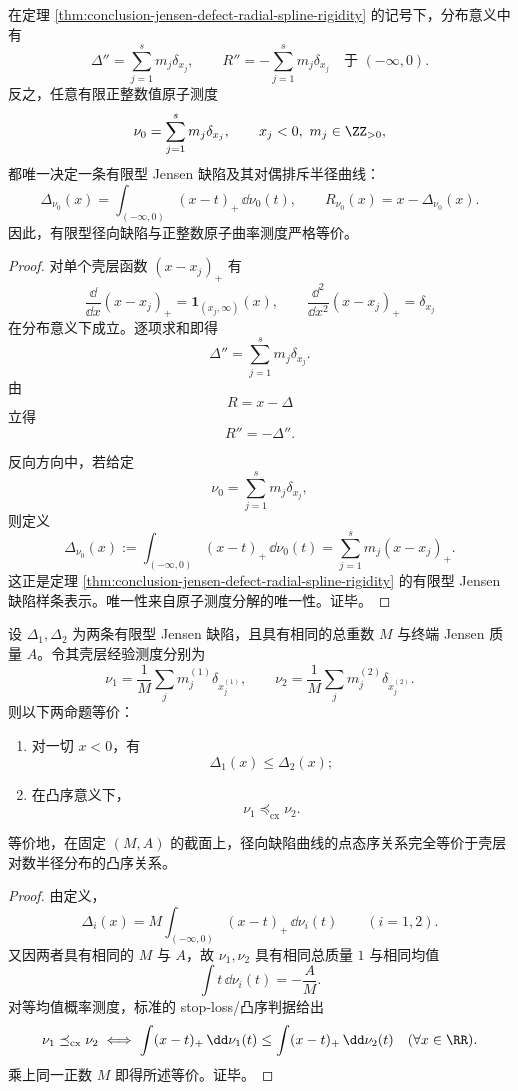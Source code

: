 \begin{theorem}\label{thm:conclusion-jensen-defect-distributional-curvature-classification}
在定理 \ref{thm:conclusion-jensen-defect-radial-spline-rigidity} 的记号下，分布意义中有
\[
\Delta''=\sum_{j=1}^{s}m_j\delta_{x_j},
\qquad
R''=-\sum_{j=1}^{s}m_j\delta_{x_j}
\quad\text{于 }(-\infty,0).
\]
反之，任意有限正整数值原子测度
\[
\nu_0=\sum_{j=1}^{s}m_j\delta_{x_j},
\qquad
x_j<0,\ m_j\in \ZZ_{>0},
\]
都唯一决定一条有限型 Jensen 缺陷及其对偶排斥半径曲线：
\[
\Delta_{\nu_0}(x)=\int_{(-\infty,0)}(x-t)_+\,\dd \nu_0(t),
\qquad
R_{\nu_0}(x)=x-\Delta_{\nu_0}(x).
\]
因此，有限型径向缺陷与正整数原子曲率测度严格等价。
\end{theorem}
\begin{proof}
对单个壳层函数 \((x-x_j)_+\) 有
\[
\frac{\dd}{\dd x}(x-x_j)_+=\mathbf 1_{(x_j,\infty)}(x),
\qquad
\frac{\dd^2}{\dd x^2}(x-x_j)_+=\delta_{x_j}
\]
在分布意义下成立。逐项求和即得
\[
\Delta''=\sum_{j=1}^{s}m_j\delta_{x_j}.
\]
由
\[
R=x-\Delta
\]
立得
\[
R''=-\Delta''.
\]

反向方向中，若给定
\[
\nu_0=\sum_{j=1}^{s}m_j\delta_{x_j},
\]
则定义
\[
\Delta_{\nu_0}(x):=\int_{(-\infty,0)}(x-t)_+\,\dd \nu_0(t)=\sum_{j=1}^{s}m_j(x-x_j)_+.
\]
这正是定理 \ref{thm:conclusion-jensen-defect-radial-spline-rigidity} 的有限型 Jensen 缺陷样条表示。唯一性来自原子测度分解的唯一性。证毕。
\end{proof}

\begin{theorem}\label{thm:conclusion-jensen-defect-convex-order-classification}
设 \(\Delta_1,\Delta_2\) 为两条有限型 Jensen 缺陷，且具有相同的总重数 \(M\) 与终端 Jensen 质量 \(A\)。令其壳层经验测度分别为
\[
\nu_1=\frac{1}{M}\sum_j m_j^{(1)}\delta_{x_j^{(1)}},
\qquad
\nu_2=\frac{1}{M}\sum_j m_j^{(2)}\delta_{x_j^{(2)}}.
\]
则以下两命题等价：
\begin{enumerate}
  \item 对一切 \(x<0\)，有
  \[
  \Delta_1(x)\le \Delta_2(x);
  \]
  \item 在凸序意义下，
  \[
  \nu_1\preceq_{\mathrm{cx}}\nu_2.
  \]
\end{enumerate}
等价地，在固定 \((M,A)\) 的截面上，径向缺陷曲线的点态序关系完全等价于壳层对数半径分布的凸序关系。
\end{theorem}
\begin{proof}
由定义，
\[
\Delta_i(x)=M\int_{(-\infty,0)}(x-t)_+\,\dd \nu_i(t)
\qquad(i=1,2).
\]
又因两者具有相同的 \(M\) 与 \(A\)，故 \(\nu_1,\nu_2\) 具有相同总质量 \(1\) 与相同均值
\[
\int t\,\dd \nu_i(t)=-\frac{A}{M}.
\]
对等均值概率测度，标准的 stop-loss/凸序判据给出
\[
\nu_1\preceq_{\mathrm{cx}}\nu_2
\iff
\int (x-t)_+\,\dd \nu_1(t)\le \int (x-t)_+\,\dd \nu_2(t)
\quad(\forall x\in \RR).
\]
乘上同一正数 \(M\) 即得所述等价。证毕。
\end{proof}

